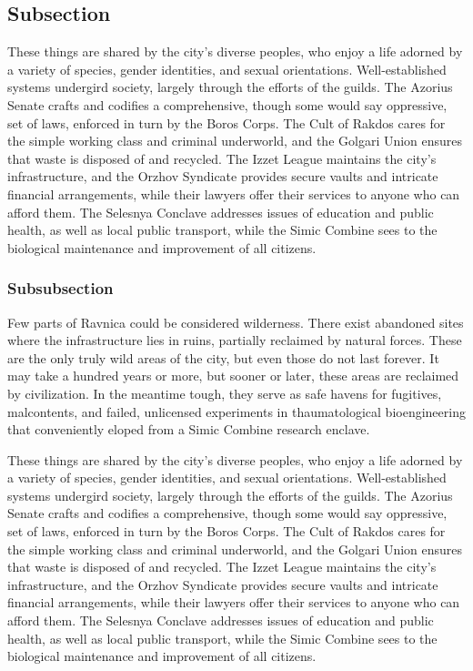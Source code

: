 \subsection{Subsection}
These things are shared by the city's diverse peoples, who enjoy a life adorned
by a variety of  species, gender identities, and sexual orientations.
Well-established systems undergird society, largely through the efforts of the
guilds. The Azorius Senate crafts and codifies a comprehensive, though some
would say oppressive, set of laws, enforced in turn by the Boros Corps. The Cult
of Rakdos cares for the simple working class and criminal underworld, and the
Golgari Union ensures that waste is disposed of and recycled. The Izzet League
maintains the city's infrastructure, and the Orzhov Syndicate provides secure
vaults and intricate financial arrangements, while their lawyers offer their
services to anyone who can afford them. The Selesnya Conclave addresses issues
of education and public health, as well as local public transport, while the
Simic Combine sees to the biological maintenance and improvement of all
citizens. 

\subsubsection{Subsubsection}
Few parts of Ravnica could be considered wilderness. There exist abandoned sites
where the infrastructure lies in ruins, partially reclaimed by natural forces.
These are the only truly wild areas of the city, but even those do not last
forever. It may take a hundred years or more, but sooner or later, these areas
are reclaimed by civilization. In the meantime tough, they serve as safe havens
for fugitives, malcontents, and failed, unlicensed experiments in
thaumatological bioengineering that conveniently eloped from a Simic Combine
research enclave.

These things are shared by the city's diverse peoples, who enjoy a life adorned
by a variety of  species, gender identities, and sexual orientations.
Well-established systems undergird society, largely through the efforts of the
guilds. The Azorius Senate crafts and codifies a comprehensive, though some
would say oppressive, set of laws, enforced in turn by the Boros Corps. The Cult
of Rakdos cares for the simple working class and criminal underworld, and the
Golgari Union ensures that waste is disposed of and recycled. The Izzet League
maintains the city's infrastructure, and the Orzhov Syndicate provides secure
vaults and intricate financial arrangements, while their lawyers offer their
services to anyone who can afford them. The Selesnya Conclave addresses issues
of education and public health, as well as local public transport, while the
Simic Combine sees to the biological maintenance and improvement of all
citizens.

